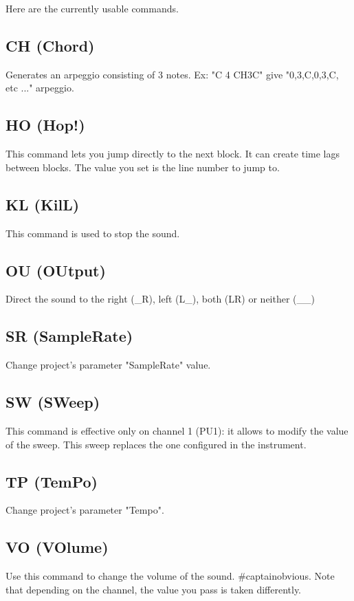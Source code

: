 
Here are the currently usable commands.

\subsection{CH (Chord)}


Generates an arpeggio consisting of 3 notes. Ex: "C 4 CH3C" give "0,3,C,0,3,C, etc ..." arpeggio.

\subsection{HO (Hop!)}

This command lets you jump directly to the next block.
It can create time lags between blocks.
The value you set is the line number to jump to.

\subsection{KL (KilL)}

This command is used to stop the sound.


\subsection{OU (OUtput)}

Direct the sound to the right (\_R), left (L\_), both (LR) or neither (\_\_)

\subsection{SR (SampleRate)}

Change project's parameter "SampleRate" value.

\subsection{SW (SWeep)}

This command is effective only on channel 1 (PU1): it allows to modify the value of the sweep.
This sweep replaces the one configured in the instrument.

\subsection{TP (TemPo)}

Change project's parameter "Tempo".

\subsection{VO (VOlume)}

Use this command to change the volume of the sound.
\#captainobvious.
Note that depending on the channel, the value you pass is taken differently.
